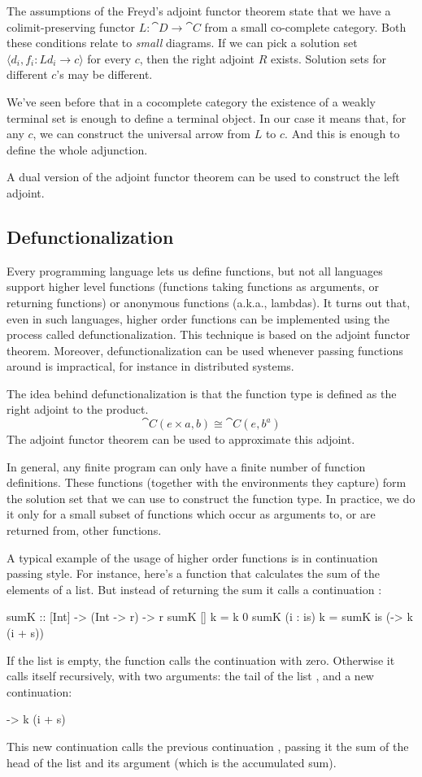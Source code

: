 \documentclass[DaoFP]{subfiles}
\begin{document}
The assumptions of the Freyd's adjoint functor theorem state that we have a colimit-preserving functor $L \colon \cat D \to \cat C$ from a small co-complete category. Both these conditions relate to \emph{small} diagrams. If we can pick a solution set $\langle d_i, f_i \colon L d_i \to c \rangle $ for every $c$, then the right adjoint $R$ exists. Solution sets for different $c$'s may be different.

We've seen before that in a cocomplete category the existence of a weakly terminal set is enough to define a terminal object. In our case it means that, for any $c$, we can construct the universal arrow from $L$ to $c$. And this is enough to define the whole adjunction.

A dual version of the adjoint functor theorem can be used to construct the left adjoint.

\subsection{Defunctionalization}

Every programming language lets us define functions, but not all languages support higher level functions (functions taking functions as arguments, or returning functions) or anonymous functions (a.k.a., lambdas). It turns out that, even in such languages, higher order functions can be implemented using the process called defunctionalization. This technique is based on the adjoint functor theorem. Moreover, defunctionalization can be used whenever passing functions around is impractical, for instance in distributed systems.

The idea behind defunctionalization is that the function type is defined as the right adjoint to the product. 
\[ \cat C(e \times a, b) \cong \cat C(e, b^a) \]
The adjoint functor theorem can be used to approximate this adjoint. 

In general, any finite program can only have a finite number of function definitions. These functions (together with the environments they capture) form the solution set that we can use to construct the function type. In practice, we do it only for a small subset of functions which occur as arguments to, or are returned from, other functions.

A typical example of the usage of higher order functions is in continuation passing style. For instance, here's a function that calculates the sum of the elements of a list. But instead of returning the sum it calls a continuation :
\begin{haskell}
sumK :: [Int] -> (Int -> r) -> r
sumK [] k = k 0
sumK (i : is) k =
  sumK is (\s -> k (i + s))
\end{haskell}
If the list is empty, the function calls the continuation with zero. Otherwise it calls itself recursively, with two arguments: the tail of the list , and a new continuation:
\begin{haskell}
\s -> k (i + s)
\end{haskell}
This new continuation calls the previous continuation , passing it the sum of the head of the list and its argument  (which is the accumulated sum). 
\end{document}
